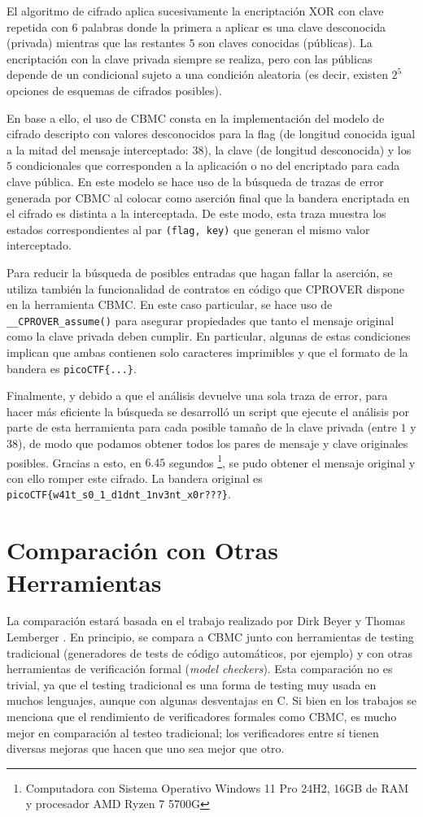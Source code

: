 \documentclass[runningheads]{llncs}
\begin{document}
El algoritmo de cifrado aplica sucesivamente la encriptación XOR con clave repetida con $6$ palabras donde la primera a aplicar es una clave desconocida (privada)
mientras que las restantes $5$ son claves conocidas (públicas).
La encriptación con la clave privada siempre se realiza, pero con las públicas depende de un condicional sujeto a una condición aleatoria (es decir,
existen $2^5$ opciones de esquemas de cifrados posibles).

En base a ello, el uso de CBMC consta en la implementación del modelo de cifrado descripto con valores desconocidos para la flag (de longitud conocida igual 
a la mitad del mensaje interceptado: $38$), la clave (de longitud desconocida) y los $5$ condicionales que corresponden a la aplicación o no del encriptado para cada clave pública.
En este modelo se hace uso de la búsqueda de trazas de error generada por CBMC al colocar como aserción final que la bandera encriptada en el cifrado es distinta a la interceptada.
De este modo, esta traza muestra los estados correspondientes al par \texttt{(flag, key)} que generan el mismo valor interceptado.

Para reducir la búsqueda de posibles entradas que hagan fallar la aserción, se utiliza también la funcionalidad de contratos en código que CPROVER dispone en la herramienta CBMC.
En este caso particular, se hace uso de \verb|__CPROVER_assume()| para asegurar propiedades que tanto el mensaje original como la clave privada deben cumplir.
En particular, algunas de estas condiciones implican que ambas contienen solo caracteres imprimibles y que el formato de la bandera es \verb|picoCTF{...}|.

Finalmente, y debido a que el análisis devuelve una sola traza de error, para hacer más eficiente la búsqueda se desarrolló un script que ejecute el análisis por 
parte de esta herramienta para cada posible tamaño de la clave privada (entre $1$ y $38$), de modo que podamos obtener todos los pares de mensaje y clave originales posibles.
Gracias a esto, en $6.45$ segundos \footnote{Computadora con Sistema Operativo Windows 11 Pro 24H2, 16GB de RAM y procesador AMD Ryzen 7 5700G}, se pudo obtener 
el mensaje original y con ello romper este cifrado.
La bandera original es \verb|picoCTF{w41t_s0_1_d1dnt_1nv3nt_x0r???}|.

%
\section{Comparación con Otras Herramientas}
La comparación estará basada en el trabajo realizado por Dirk Beyer y Thomas Lemberger \cite{cbmc-comparison}.
En principio, se compara a CBMC junto con herramientas de testing tradicional (generadores de tests de código automáticos, por ejemplo) y
con otras herramientas de verificación formal (\textit{model checkers}).
Esta comparación no es trivial, ya que el testing tradicional es una forma de testing muy usada en muchos lenguajes, aunque con algunas desventajas en C.
Si bien en los trabajos se menciona que el rendimiento de verificadores formales como CBMC, es mucho mejor en comparación al testeo tradicional; los verificadores
entre sí tienen diversas mejoras que hacen que uno sea mejor que otro.
\end{document}
